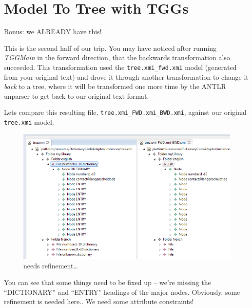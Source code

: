 \newpage
\section{Model To Tree with TGGs}

Bonus: we ALREADY have this!

This is the second half of our trip. You may have noticed after running \emph{TGGMain} in the forward direction, that the backwards transformation also
succeeded. This transformation used the \texttt{tree.xmi\_fwd.xmi} model (generated from your original text) and drove it through another transformation to
change it \emph{back} to a tree, where it will be transformed one more time by the ANTLR unparser to get back to our original text format.

Lets compare this resulting file, \texttt{tree.xmi\_FWD.xmi\_BWD.xmi}, against our original \texttt{tree.xmi} model.

\begin{figure}[htp]
\begin{center}
  \includegraphics[width=\textwidth]{eclipse_generatedBackwardsModel}
  \caption{needs refinement\ldots}
  \label{eclipse:generatedBkwrdMdl}
\end{center}
\end{figure}

You can see that some things need to be fixed up -- we're missing the ``DICTIONARY'' and ``ENTRY" headings of the major nodes. Obviously, some refinement is
needed here.. We need some attribute constraints!





